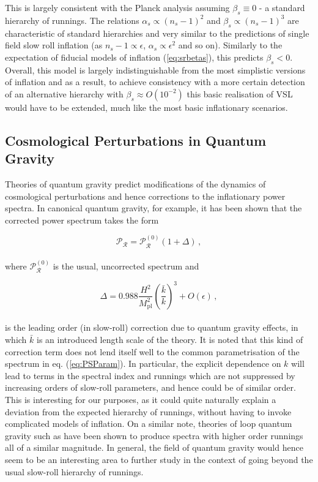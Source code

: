 \documentclass[universe,preprints,oneauthor,pdftex,10pt,a4paper]{mdpi}
\newcommand{\beq}{\begin{equation}}
\newcommand{\eeq}{\end{equation}\\}
\newcommand{\rpar}[1]{\left(#1\right)}
\begin{document}
This is largely consistent with the Planck analysis assuming $\beta_s \equiv 0$ - a standard hierarchy of runnings. The relations  $\alpha_s \propto (n_s -1)^2$ and $\beta_s \propto (n_s-1)^3$ are characteristic of standard hierarchies and very similar to the predictions of single field slow roll inflation (as $n_s-1 \propto \epsilon$, $\alpha_s \propto \epsilon^2$ and so on). Similarly to the expectation of fiducial models of inflation (\ref{eq:srbetas}), this predicts $\beta_s < 0$. Overall, this model is largely indistinguishable from the most simplistic versions of inflation and as a result, to achieve consistency with a more certain detection of an alternative hierarchy with $\beta_s \approx O(10^{-2})$ this basic realisation of VSL would have to be extended, much like the most basic inflationary scenarios.

\subsection{Cosmological Perturbations in Quantum Gravity}

Theories of quantum gravity predict modifications of the dynamics of cosmological perturbations and hence corrections to the inflationary power spectra. In canonical quantum gravity, for example, it has been shown \cite{Brizuela:2015tzl,Brizuela:2016gnz} that the corrected power spectrum takes the form

\beq
\mathcal{P}_\mathcal{R} = \mathcal{P}_\mathcal{R}^{(0)} (1 + \Delta) \, , \label{eq:cqgcorrection}
\eeq

where $\mathcal{P}_\mathcal{R}^{(0)}$ is the usual, uncorrected spectrum and

\beq
\Delta = 0.988 \frac{H^2}{M_\text{pl}^2} \rpar{\frac{\bar{k}}{k}}^3  + O(\epsilon) \, ,
\eeq

is the leading order (in slow-roll) correction due to quantum gravity effects, in which $\bar{k}$ is an introduced length scale of the theory. It is noted that this kind of correction term does not lend itself well to the common parametrisation of the spectrum in eq. (\ref{eq:PSParam}). In particular, the explicit dependence on $k$ will lead to terms in the spectral index and runnings which are not suppressed by increasing orders of slow-roll parameters, and hence could be of similar order. This is interesting for our purposes, as it could quite naturally explain a deviation from the expected hierarchy of runnings, without having to invoke complicated models of inflation. On a similar note, theories of loop quantum gravity such as \cite{Bojowald:2011iq} have been shown to produce spectra with higher order runnings all of a similar magnitude. In general, the field of quantum gravity would hence seem to be an interesting area to further study in the context of going beyond the usual slow-roll hierarchy of runnings.
\end{document}
